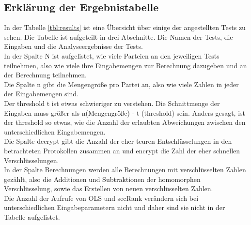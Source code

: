 \subsection{Erklärung der Ergebnistabelle}
In der Tabelle \ref{tbl:results} ist eine Übersicht über einige der angestellten Tests zu sehen. Die Tabelle ist aufgeteilt in drei Abschnitte. Die Namen der Tests, die Eingaben und die Analyseergebnisse der Tests.\\
In der Spalte \glqq N\grqq{}  ist aufgelistet, wie viele Parteien an den jeweiligen Tests teilnehmen, also wie viele ihre Eingabemengen zur Berechnung dazugeben und an der Berechnung teilnehmen.\\
Die Spalte \glqq n\grqq{} gibt die Mengengröße pro Partei an, also wie viele Zahlen in jeder der Eingabemengen sind.\\
Der \glqq threshold\grqq{} t ist etwas schwieriger zu verstehen. Die Schnittmenge der Eingaben muss größer als n(Mengengröße) - t (threshold) sein. Anders gesagt, ist der threshold so etwas, wie die Anzahl der erlaubten Abweichungen zwischen den unterschiedlichen Eingabemengen.\\
Die Spalte \glqq decrypt\grqq{} gibt die Anzahl der eher teuren Entschlüsselungen in den betrachteten Protokollen zusammen an und \glqq encrypt\grqq{} die Zahl der eher schnellen Verschlüsselungen.\\
In der Spalte Berechnungen werden alle Berechnungen mit verschlüsselten Zahlen gezählt, also die Additionen und Subtraktionen der homomorphen Verschlüsselung, sowie das Erstellen von neuen verschlüsselten Zahlen.\\
Die Anzahl der Aufrufe von OLS und secRank verändern sich bei unterschiedlichen Eingabeparametern nicht und daher sind sie nicht in der Tabelle aufgelistet.\\

